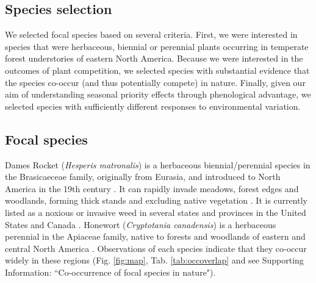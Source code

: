 \documentclass{article}[11pt]
\begin{document}
\subsection*{Species selection}
We selected focal species based on several criteria. First, we were interested in species that were herbaceous, biennial or perennial plants occurring in temperate forest understories of eastern North America. Because we were interested in the outcomes of plant competition, we selected species with substantial evidence that the species co-occur (and thus potentially compete) in nature. Finally, given our aim of understanding seasonal priority effects through phenological advantage, we selected species with sufficiently different responses to environmental variation.

\subsection*{Focal species}
Dames Rocket (\textit{Hesperis matronalis}) is a herbaceous biennial/perennial species in the Brasicaeceae family, originally from Eurasia, and introduced to North America in the 19th century \citep{Francis:2009wz}. It  can rapidly invade  meadows, forest edges and woodlands, forming thick stands and excluding native vegetation \citep{Francis:2009wz}. It is currently listed as a noxious or invasive weed in several states and provinces in the United States and Canada \citep{Susko:2008ut}. Honewort (\textit{Cryptotania canadensis}) is a herbaceous perennial in the Apiaceae family, native to forests and woodlands of eastern and central North America \citep{Hawkins:2007vb}. Observations of each species indicate that they co-occur widely in these regions (Fig. \ref{fig:map}, Tab. \ref{tab:occoverlap} and see Supporting Information: ``Co-occurrence of focal species in nature").  
\end{document}
